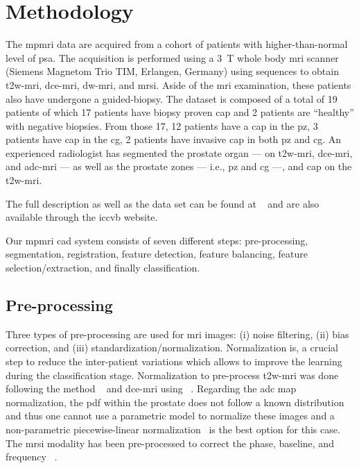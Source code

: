 \section{Methodology}\label{sec:chp6:method}

The \ac{mpmri} data are acquired from a cohort of patients with higher-than-normal level of \ac{psa}.
The acquisition is performed using a \SI{3}{\tesla} whole body \ac{mri} scanner (Siemens Magnetom Trio TIM, Erlangen, Germany) using sequences to obtain \ac{t2w}-\ac{mri}, \ac{dce}-\ac{mri}, \ac{dw}-\ac{mri}, and \ac{mrsi}.
Aside of the \ac{mri} examination, these patients also have undergone a guided-biopsy.
The dataset is composed of a total of 19 patients of which 17 patients have biopsy proven \ac{cap} and 2 patients are ``healthy'' with negative biopsies.
From those 17, 12 patients have a \ac{cap} in the \ac{pz}, 3 patients have \ac{cap} in the \ac{cg}, 2 patients have invasive \ac{cap} in both \ac{pz} and \ac{cg}.
An experienced radiologist has segmented the prostate organ --- on \ac{t2w}-\ac{mri}, \ac{dce}-\ac{mri}, and \ac{adc}-\ac{mri} --- as well as the prostate zones --- i.e., \ac{pz} and \ac{cg} ---, and \ac{cap} on the \ac{t2w}-\ac{mri}.

The full description as well as the data set can be found at ~\cite{Lemaitre2016thesis}  and are also available through the \acs{iccvb} website.



Our \ac{mpmri} \ac{cad} system consists of seven different steps: pre-processing, segmentation, registration, feature detection, feature balancing, feature selection/extraction, and finally classification.

\subsection{Pre-processing}\label{subsec:chp6:method:PP}

Three types of pre-processing are used for \ac{mri} images: (i) noise filtering, (ii) bias correction, and (iii) standardization/normalization.
Normalization is, a crucial step to reduce the inter-patient variations which allows to improve the learning during the classification stage.
 Normalization to pre-process \ac{t2w}-\ac{mri} was done following the method ~\cite{lemaitre2016normalization} and \ac{dce}-\ac{mri} using ~\cite{Lemaitre2016thesis}.
Regarding the \ac{adc} map normalization, the \ac{pdf} within the prostate does not follow a known distribution and thus one cannot use a parametric model to normalize these images and a non-parametric piecewise-linear normalization~\cite{Nyul2000} is the best option for this case.
The \ac{mrsi} modality has been pre-processed to correct the phase, baseline, and frequency ~\cite{Lemaitre2016thesis}.


